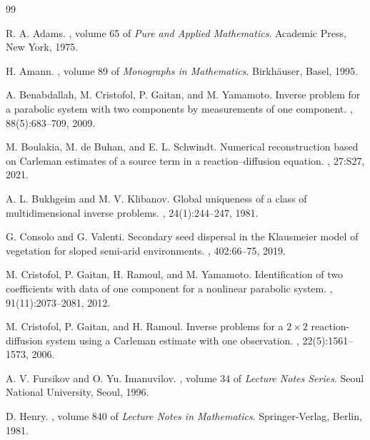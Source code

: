 \documentclass[12pt]{amsart}
\theoremstyle{plain}
\theoremstyle{definition}
\theoremstyle{remark}
\begin{document}
\newpage

\begin{thebibliography}{99}


R. A. Adams.
, volume 65 of {\em Pure and Applied Mathematics}.
\newblock Academic Press, New York, 1975.

H. Amann.
,
 volume 89 of {\em Monographs in Mathematics}.
\newblock Birkh\"auser, Basel, 1995.

A. Benabdallah, M. Cristofol, P. Gaitan, and M. Yamamoto.
\newblock Inverse problem for a parabolic system with two components by measurements of one component.
, 88(5):683--709, 2009.

M. Boulakia, M. de Buhan, and E. L. Schwindt.
\newblock Numerical reconstruction based on Carleman estimates of a source term in a reaction--diffusion equation.
, 27:S27, 2021.

A. L. Bukhgeim and M. V. Klibanov.
\newblock Global uniqueness of a class of multidimensional inverse problems.
, 24(1):244--247, 1981.

G. Consolo and G. Valenti.
\newblock Secondary seed dispersal in the Klausmeier model of vegetation for sloped semi-arid environments.
, 402:66--75, 2019.

M. Cristofol, P. Gaitan, H. Ramoul, and M. Yamamoto.
\newblock Identification of two coefficients with data of one component for a nonlinear parabolic system.
, 91(11):2073--2081, 2012.

M. Cristofol, P. Gaitan, and H. Ramoul.
\newblock Inverse problems for a $2\times 2$ reaction-diffusion system using a Carleman estimate with one observation.
, 22(5):1561--1573, 2006.

A. V. Fursikov and O. Yu. Imanuvilov.
, volume 34 of {\em Lecture Notes Series}.
\newblock Seoul National University, Seoul, 1996.

D. Henry.
, volume 840 of {\em Lecture Notes in Mathematics}.
\newblock Springer-Verlag, Berlin, 1981.


\end{thebibliography}
\end{document}
